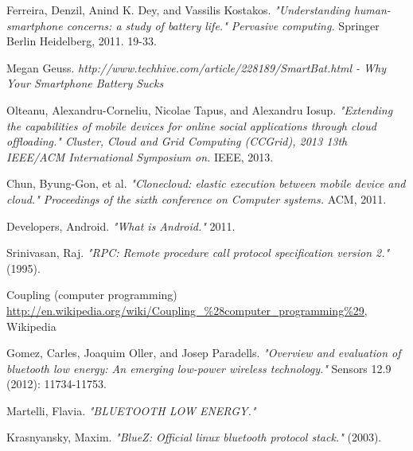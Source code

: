 \documentclass[twoside]{article}
\begin{document}
\begin{thebibliography}{1}

 Ferreira, Denzil, Anind K. Dey, and Vassilis Kostakos. {\em "Understanding human-smartphone concerns: a study of battery life." Pervasive computing.} Springer Berlin Heidelberg, 2011. 19-33.

 Megan Geuss. {\em http://www.techhive.com/article/228189/SmartBat.html - Why Your Smartphone Battery Sucks}

 Olteanu, Alexandru-Corneliu, Nicolae Tapus, and Alexandru Iosup. {\em "Extending the capabilities of mobile devices for online social applications through cloud offloading." Cluster, Cloud and Grid Computing (CCGrid), 2013 13th IEEE/ACM International Symposium on.} IEEE, 2013.

 Chun, Byung-Gon, et al. {\em "Clonecloud: elastic execution between mobile device and cloud." Proceedings of the sixth conference on Computer systems.} ACM, 2011.

 Developers, Android. {\em "What is Android."} 2011.

 Srinivasan, Raj. {\em "RPC: Remote procedure call protocol specification version 2."} (1995).

 Coupling (computer programming) \url{http://en.wikipedia.org/wiki/Coupling_%28computer_programming%29}, Wikipedia

 Gomez, Carles, Joaquim Oller, and Josep Paradells. {\em "Overview and evaluation of bluetooth low energy: An emerging low-power wireless technology."} Sensors 12.9 (2012): 11734-11753.

 Martelli, Flavia. {\em "BLUETOOTH LOW ENERGY."}

 Krasnyansky, Maxim. {\em "BlueZ: Official linux bluetooth protocol stack."} (2003).

\end{thebibliography}
\end{document}
